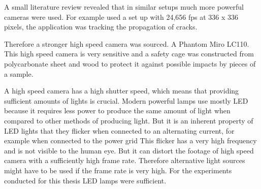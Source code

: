 A small literature review revealed that in similar setups much more powerful cameras were used. For example \textcite{Kukolj2018} used a set up with 24,656 fps at 336 x 336 pixels, the application was tracking the propagation of cracks. %

Therefore a stronger high speed camera was sourced. A Phantom Miro LC110. This high speed camera is very sensitive and a safety cage was constructed from polycarbonate sheet and wood to protect it against possible impacts by pieces of a sample.%

A high speed camera has a high shutter speed, which means that providing sufficient amounts of lights is crucial. Modern powerful lamps use mostly LED because it requires less power to produce the same amount of light when compared to other methods of producing light. 
But it is an inherent property of LED lights that they flicker when connected to an alternating current, for example when connected to the power grid \autocite[74]{steffen07} This flicker has a very high frequency and is not visible to the human eye. But it can distort the footage of high speed camera with a sufficiently high frame rate. Therefore alternative light sources might have to be used if the frame rate is very high. For the experiments conducted for this thesis LED lamps were sufficient. 


